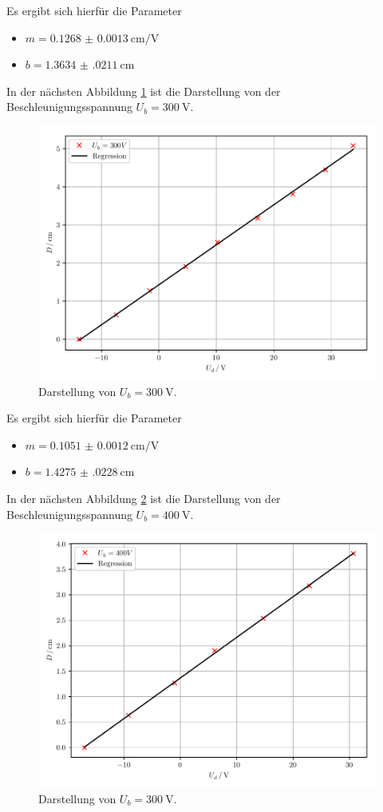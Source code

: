 Es ergibt sich hierfür die Parameter
\begin{itemize}
  \item $m=\SI{0.1268(13)}{\centi\meter\per\volt}$
  \item $b=\SI{1.3634(0211)}{\centi\meter}$
\end{itemize}
In der nächsten Abbildung \ref{abb:8} ist die Darstellung von der Beschleunigungsspannung $U_b=\SI{300}{\volt}$.
\begin{figure}[H]
  \centering
  \includegraphics{plot3.pdf}
  \caption{Darstellung von $U_b=\SI{300}{\volt}$.}
  \label{abb:8}
\end{figure}
Es ergibt sich hierfür die Parameter
\begin{itemize}
  \item $m=\SI{0.1051(12)}{\centi\meter\per\volt}$
  \item $b=\SI{1.4275(0228)}{\centi\meter}$
\end{itemize}
In der nächsten Abbildung \ref{abb:9} ist die Darstellung von der Beschleunigungsspannung $U_b=\SI{400}{\volt}$.
\begin{figure}[H]
  \centering
  \includegraphics{plot4.pdf}
  \caption{Darstellung von $U_b=\SI{300}{\volt}$.}
  \label{abb:9}
\end{figure}

